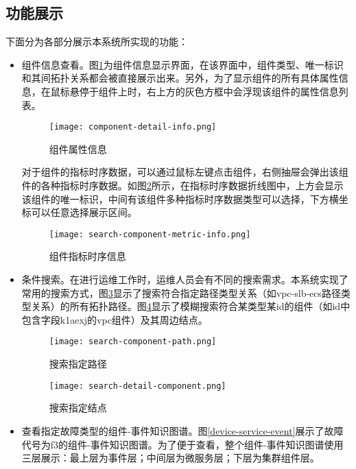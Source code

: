 \subsection{功能展示}
下面分为各部分展示本系统所实现的功能：
\begin{itemize}
    \item [（1）]组件信息查看。图\ref{component-detail-info}为组件信息显示界面，在该界面中，组件类型、唯一标识和其间拓扑关系都会被直接展示出来。另外，为了显示组件的所有具体属性信息，在鼠标悬停于组件上时，右上方的灰色方框中会浮现该组件的属性信息列表。
    \begin{figure}[htbp]
        \centering
        \texttt{[image: component-detail-info.png]}
        \caption{组件属性信息\label{component-detail-info}}
    \end{figure}
    
    对于组件的指标时序数据，可以通过鼠标左键点击组件，右侧抽屉会弹出该组件的各种指标时序数据。如图\ref{search-component-metric-info}所示，在指标时序数据折线图中，上方会显示该组件的唯一标识，中间有该组件多种指标时序数据类型可以选择，下方横坐标可以任意选择展示区间。
\begin{figure}[htbp]
    \centering
    \texttt{[image: search-component-metric-info.png]}
    \caption{组件指标时序信息\label{search-component-metric-info}}
\end{figure}
    \newpage
    \item [（2）]条件搜索。在进行运维工作时，运维人员会有不同的搜索需求。本系统实现了常用的搜索方式，图\ref{search-component-path}显示了搜索符合指定路径类型关系（如vpc-slb-ecs路径类型关系）的所有拓扑路径。图\ref{search-detail-component}显示了模糊搜索符合某类型某id的组件（如id中包含字段k1aexj的vpc组件）及其周边结点。

    \begin{figure}[htbp]
        \centering
        \texttt{[image: search-component-path.png]}
        \caption{搜索指定路径\label{search-component-path}}
    \end{figure}
    \begin{figure}[htbp]
        \centering
        \texttt{[image: search-detail-component.png]}
        \caption{搜索指定结点\label{search-detail-component}}
    \end{figure}
    \newpage
    \item [（3）]查看指定故障类型的组件-事件知识图谱。图\ref{device-service-event}展示了故障代号为f3的组件-事件知识图谱。为了便于查看，整个组件-事件知识图谱使用三层展示：最上层为事件层；中间层为微服务层；下层为集群组件层。


\end{itemize}
